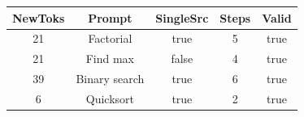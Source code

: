 \begin{table}[h]
\centering
\begin{tabular}{ |c|c|c|c|c| }
\hline
NewToks & Prompt & SingleSrc & Steps & Valid \\
\hline
21 & Factorial & true & 5 & true \\
\hline
21 & Find max & false & 4 & true \\
\hline
39 & Binary search & true & 6 & true \\
\hline
6 & Quicksort & true & 2 & true \\
\hline
\end{tabular}
\end{table}
